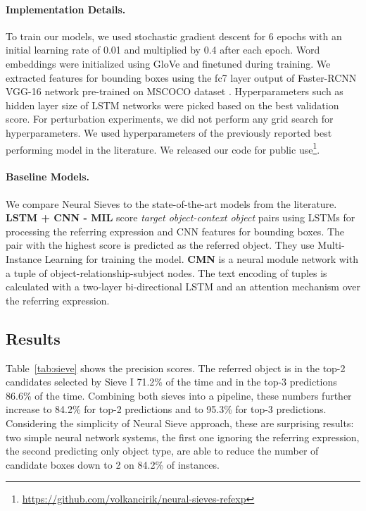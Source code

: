 \documentclass[11pt,a4paper]{article}
\begin{document}
\paragraph{Implementation Details.} 
To train our models, we used stochastic gradient descent for 6 epochs with an initial learning rate of 0.01 and multiplied by 0.4 after each epoch.
Word embeddings were initialized using GloVe \citep{pennington2014glove} and finetuned during training.
We extracted features for bounding boxes using the fc7 layer output of Faster-RCNN VGG-16 network \citep{ren2015faster} pre-trained on MSCOCO dataset \citep{lin2014microsoft}.
Hyperparameters such as hidden layer size of LSTM networks were picked based on the best validation score.
For perturbation experiments, we did not perform any grid search for hyperparameters. We used hyperparameters of the previously reported best performing model in the literature.
We released our code for public use\footnote{\href{https://github.com/volkancirik/neural-sieves-refexp}{https://github.com/volkancirik/neural-sieves-refexp}}.

\paragraph{Baseline Models.} We compare Neural Sieves to the state-of-the-art models from the literature.
\textbf{LSTM + CNN - MIL} \citet{nagaraja16refexp} score \textit{target object-context object} pairs using LSTMs for processing the referring expression and CNN features for bounding boxes. The pair with the highest score is predicted as the referred object.
They use Multi-Instance Learning for training the model.
\textbf{CMN} \citep{hu2017modeling} is a neural module network with a tuple of object-relationship-subject nodes.
The text encoding of tuples is calculated with a two-layer bi-directional LSTM and an attention mechanism \citep{bahdanau2014neural} over the referring expression.
\vspace{-5pt}
\subsection{Results}
\vspace{-5pt}
Table~\ref{tab:sieve} shows the precision scores.
The referred object is in the top-2 candidates selected by Sieve I 71.2\% of the time and in the top-3 predictions 86.6\% of the time. 
Combining both sieves into a pipeline,
these numbers further increase to 84.2\% for top-2 predictions and to 95.3\% for top-3 predictions.
Considering the simplicity of Neural Sieve approach, these are surprising results: two simple neural network systems, the first one ignoring the referring expression, the second predicting only object type, are able to reduce the number of candidate boxes down to 2 on 84.2\% of instances.
\vspace{-5pt}
\end{document}
